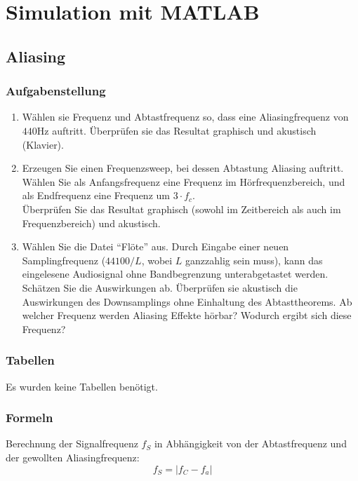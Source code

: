 \section{Simulation mit MATLAB}

%
%
\subsection{Aliasing}
\subsubsection{Aufgabenstellung}
\begin{enumerate}
\item Wählen sie Frequenz und Abtastfrequenz so, dass eine Aliasingfrequenz von $440$Hz auftritt. Überprüfen sie das Resultat graphisch und akustisch (Klavier).
\item Erzeugen Sie einen Frequenzsweep, bei dessen Abtastung Aliasing auftritt. Wählen Sie als Anfangsfrequenz eine Frequenz im Hörfrequenzbereich, und als Endfrequenz eine Frequenz um $3 \cdot f_c$. \\
Überprüfen Sie das Resultat graphisch (sowohl im Zeitbereich als auch im Frequenzbereich) und akustisch. 
\item Wählen Sie die Datei ``Flöte'' aus. Durch Eingabe einer neuen Samplingfrequenz ($44100/L$, wobei $L$ ganzzahlig sein muss), kann das eingelesene Audiosignal ohne Bandbegrenzung unterabgetastet werden. Schätzen Sie die Auswirkungen ab. Überprüfen sie akustisch die Auswirkungen des Downsamplings ohne Einhaltung des Abtasttheorems. Ab welcher Frequenz werden Aliasing Effekte hörbar? Wodurch ergibt sich diese Frequenz?
\end{enumerate}



\subsubsection{Tabellen}
Es wurden keine Tabellen benötigt.

\subsubsection{Formeln}
Berechnung der Signalfrequenz $f_S$ in Abhängigkeit von der Abtastfrequenz und der gewollten Aliasingfrequenz:
\begin{equation}\label{eq:1_1}
 f_S = |f_C - f_a|
\end{equation}

